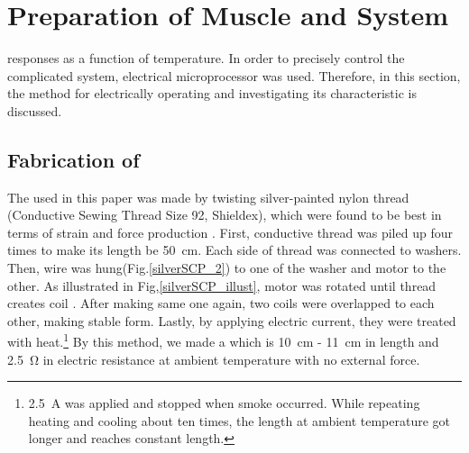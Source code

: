 \section{Preparation of Muscle and System}\label{section_preparation}
\scp responses as a function of temperature. In order to precisely control the complicated system, electrical microprocessor was used. Therefore, in this section, the method for electrically operating \scp and investigating its characteristic is discussed. 

\subsection{Fabrication of \SCP}
The \scp used in this paper was made by twisting silver-painted nylon thread (Conductive Sewing Thread Size 92, Shieldex), which were found to be best in terms of strain and force production \cite{haines}. First, conductive thread was piled up four times to make its length be \SI{50}{\centi\meter}. Each side of thread was connected to washers. Then, wire was hung(Fig.\ref{silverSCP_2}) to one of the washer and motor to the other. 
As illustrated in Fig,\ref{silverSCP_illust}, motor was rotated until thread creates coil \cite{fab_coil}. After making same one again, two coils were overlapped to each other, making stable form. Lastly, by applying electric current, they were treated with heat.\footnote{\SI{2.5}{\ampere} was applied and stopped when smoke occurred. While repeating heating and cooling about ten times, the length at ambient temperature got longer and reaches constant length.} By this method, we made a \scp which is \SI{10}{\centi\meter} - \SI{11}{\centi\meter} in length and \SI{2.5}{\ohm} in electric resistance at ambient temperature with no external force.

